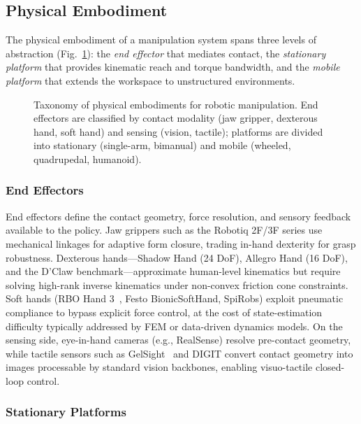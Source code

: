 \documentclass[acmsmall,screen,review,anonymous]{acmart}
\begin{document}
\subsection{Physical Embodiment}

The physical embodiment of a manipulation system spans three levels of abstraction (Fig.~\ref{fig:embodiment_taxonomy}): the \emph{end effector} that mediates contact, the \emph{stationary platform} that provides kinematic reach and torque bandwidth, and the \emph{mobile platform} that extends the workspace to unstructured environments.

\begin{figure}[t]
\centering
\caption{Taxonomy of physical embodiments for robotic manipulation. End effectors are classified by contact modality (jaw gripper, dexterous hand, soft hand) and sensing (vision, tactile); platforms are divided into stationary (single-arm, bimanual) and mobile (wheeled, quadrupedal, humanoid).}\label{fig:embodiment_taxonomy}
\end{figure}

\subsubsection{End Effectors}\label{subsec:end_effectors}

End effectors define the contact geometry, force resolution, and sensory feedback available to the policy. Jaw grippers such as the Robotiq 2F/3F series use mechanical linkages for adaptive form closure, trading in-hand dexterity for grasp robustness. Dexterous hands---Shadow Hand (24 DoF), Allegro Hand (16 DoF), and the D'Claw benchmark---approximate human-level kinematics but require solving high-rank inverse kinematics under non-convex friction cone constraints. Soft hands (RBO Hand 3~\cite{Puhlmann_2022}, Festo BionicSoftHand, SpiRobs) exploit pneumatic compliance to bypass explicit force control, at the cost of state-estimation difficulty typically addressed by FEM or data-driven dynamics models. On the sensing side, eye-in-hand cameras (e.g., RealSense) resolve pre-contact geometry, while tactile sensors such as GelSight~\cite{zhao2023gelsightsveltehumanfingershaped} and DIGIT convert contact geometry into images processable by standard vision backbones, enabling visuo-tactile closed-loop control.

\subsubsection{Stationary Platforms}\label{subsec:manipulators}
\end{document}

